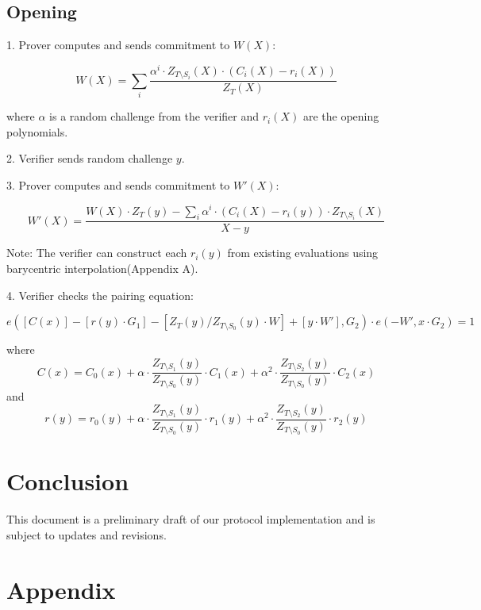 \documentclass[12pt,a4paper]{article}
\begin{document}
\subsection{Opening}

1. Prover computes and sends commitment to $W(X)$:

\begin{equation}
W(X) = \sum_i \frac{\alpha^i \cdot Z_{T\setminus S_i}(X) \cdot (C_i(X) - r_i(X))}{Z_T(X)}
\end{equation}

where $\alpha$ is a random challenge from the verifier and $r_i(X)$ are the opening polynomials.

2. Verifier sends random challenge $y$.

3. Prover computes and sends commitment to $W'(X)$:

\begin{equation}
W'(X) = \frac{W(X) \cdot Z_T(y) - \sum_i \alpha^i \cdot (C_i(X) - r_i(y)) \cdot Z_{T\setminus S_i}(X)}{X - y}
\end{equation}

Note: The verifier can construct each $r_i(y)$ from existing evaluations using barycentric interpolation(Appendix A).

4. Verifier checks the pairing equation:

\begin{equation}
e([C(x)] - [r(y) \cdot G_1] - [Z_T(y) / Z_{T \setminus S_0}(y) \cdot W] + [y \cdot W'], G_2) \cdot e(-W', x \cdot G_2) = 1
\end{equation}

where 
\[
C(x) = C_0(x) + \alpha \cdot \frac{Z_{T \setminus S_1}(y)}{Z_{T \setminus S_0}(y)} \cdot C_1(x) + \alpha^2 \cdot \frac{Z_{T \setminus S_2}(y)}{Z_{T \setminus S_0}(y)} \cdot C_2(x)
\]
and
\[
r(y) = r_0(y) + \alpha \cdot \frac{Z_{T \setminus S_1}(y)}{Z_{T \setminus S_0}(y)} \cdot r_1(y) + \alpha^2 \cdot \frac{Z_{T \setminus S_2}(y)}{Z_{T \setminus S_0}(y)} \cdot r_2(y)
\]

\section{Conclusion}

This document is a preliminary draft of our protocol implementation and is subject to updates and revisions.

\section{Appendix}
\end{document}
